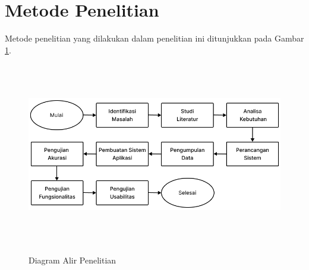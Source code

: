 \fancyhf{} 
\fancyfoot[R]{\thepage}

\begin{figure}[H]
\end{figure}

\fancyhf{} 
\fancyfoot[R]{\thepage}

\section{Metode Penelitian}
Metode penelitian yang dilakukan dalam penelitian ini ditunjukkan pada Gambar \ref{img:diagram_alir_penelitian}.

\begin{figure}[H]
\centering
{\includegraphics [width = 14cm, height= 8cm]{gambar/bab3/diagram_alir}}
\caption{Diagram Alir Penelitian}
\label{img:diagram_alir_penelitian}
\end{figure}

